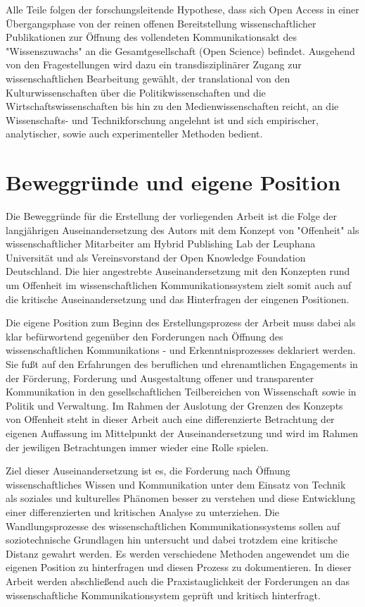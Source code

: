 Alle Teile folgen der forschungsleitende Hypothese, dass sich Open Access in einer Übergangsphase von der reinen offenen Bereitstellung wissenschaftlicher Publikationen zur Öffnung des vollendeten Kommunikationsakt des "Wissenszuwachs" \cite{Luhmann1998} an die Gesamtgesellschaft (Open Science) befindet. Ausgehend von den Fragestellungen wird dazu ein transdisziplinärer Zugang zur wissenschaftlichen Bearbeitung gewählt, der translational von den Kulturwissenschaften über die Politikwissenschaften und die Wirtschaftswissenschaften bis hin zu den Medienwissenschaften reicht, an die Wissenschafts- und Technikforschung angelehnt ist und sich empirischer, analytischer, sowie auch experimenteller Methoden bedient.

\section{Beweggründe und eigene Position}

Die Beweggründe für die Erstellung der vorliegenden Arbeit ist die Folge der langjährigen Auseinandersetzung des Autors mit dem Konzept von "Offenheit" als wissenschaftlicher Mitarbeiter am Hybrid Publishing Lab der Leuphana Universität und als Vereinsvorstand der Open Knowledge Foundation Deutschland. Die hier angestrebte Auseinandersetzung mit den Konzepten rund um Offenheit im wissenschaftlichen Kommunikationssystem zielt somit auch auf die kritische Auseinandersetzung und das Hinterfragen der eingenen Positionen.

Die eigene Position zum Beginn des Erstellungsprozess der Arbeit muss dabei als klar befürwortend gegenüber den Forderungen nach Öffnung des wissenschaftlichen Kommunikations - und Erkenntnisprozesses deklariert werden. Sie fußt auf den Erfahrungen des beruflichen und ehrenamtlichen Engagements in der Förderung, Forderung und Ausgestaltung offener und transparenter Kommunikation in den gesellschaftlichen Teilbereichen von Wissenschaft sowie in Politik und Verwaltung. Im Rahmen der Auslotung der Grenzen des Konzepts von Offenheit steht in dieser Arbeit auch eine differenzierte Betrachtung der eigenen Auffassung im Mittelpunkt der Auseinandersetzung und wird im Rahmen der jewiligen Betrachtungen immer wieder eine Rolle spielen.

Ziel dieser Auseinandersetzung ist es, die Forderung nach Öffnung wissenschaftliches Wissen und Kommunikation unter dem Einsatz von Technik als soziales und kulturelles Phänomen besser zu verstehen und diese Entwicklung einer differenzierten und kritischen Analyse zu unterziehen. Die Wandlungsprozesse des wissenschaftlichen Kommunikationssystems sollen auf soziotechnische Grundlagen hin untersucht und dabei trotzdem eine kritische Distanz gewahrt werden. Es werden verschiedene Methoden angewendet um die eigenen Position zu hinterfragen und diesen Prozess zu dokumentieren. In dieser Arbeit werden abschließend auch die Praxistauglichkeit der Forderungen an das wissenschaftliche Kommunikationsystem geprüft und kritisch hinterfragt.

